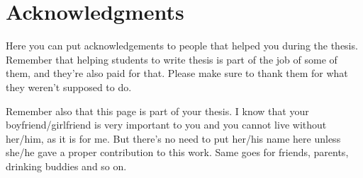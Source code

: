 
\bigskip

\begingroup
\let\clearpage\relax
\let\cleardoublepage\relax
\let\cleardoublepage\relax
\chapter*{Acknowledgments}
Here you can put acknowledgements to people that helped you during the thesis. Remember that helping students to write thesis is part of the job of some of them, and they're also paid for that. Please make sure to thank them for what they weren't supposed to do.

Remember also that this page is part of your thesis. I know that your boyfriend/girlfriend is very important to you and you cannot live without her/him, as it is for me. But there's no need to put her/his name here unless she/he gave a proper contribution to this work. Same goes for friends, parents, drinking buddies and so on.

\endgroup
